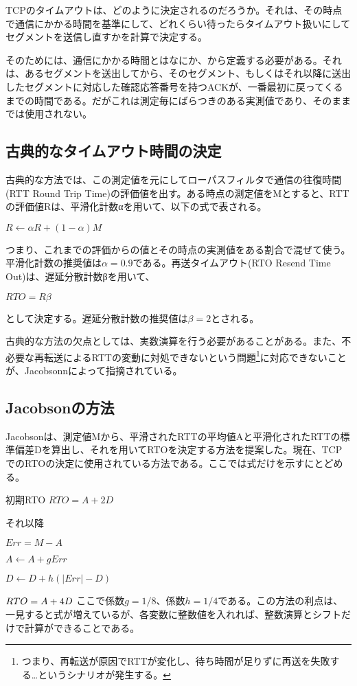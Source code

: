 TCPのタイムアウトは、どのように決定されるのだろうか。それは、その時点で通信にかかる時間を基準にして、どれくらい待ったらタイムアウト扱いにしてセグメントを送信し直すかを計算で決定する。

そのためには、通信にかかる時間とはなにか、から定義する必要がある。それは、あるセグメントを送出してから、そのセグメント、もしくはそれ以降に送出したセグメントに対応した確認応答番号を持つACKが、一番最初に戻ってくるまでの時間である。だがこれは測定毎にばらつきのある実測値であり、そのままでは使用されない。

\subsection{古典的なタイムアウト時間の決定}

古典的な方法では、この測定値を元にしてローパスフィルタで通信の往復時間(RTT Round Trip Time)の評価値を出す。ある時点の測定値をMとすると、RTTの評価値Rは、平滑化計数αを用いて、以下の式で表される。


$R ← αR + (1-α)M$


つまり、これまでの評価からの値とその時点の実測値をある割合で混ぜて使う。平滑化計数の推奨値は$α=0.9$である。再送タイムアウト(RTO Resend Time Out)は、遅延分散計数βを用いて、

$RTO = Rβ$

として決定する。遅延分散計数の推奨値は$β=2$とされる。

古典的な方法の欠点としては、実数演算を行う必要があることがある。また、不必要な再転送によるRTTの変動に対処できないという問題\footnote{つまり、再転送が原因でRTTが変化し、待ち時間が足りずに再送を失敗する…というシナリオが発生する。}に対応できないことが、Jacobsonnによって指摘されている。

\subsection{Jacobsonの方法}

Jacobsonは、測定値Mから、平滑されたRTTの平均値Aと平滑化されたRTTの標準偏差Dを算出し、それを用いてRTOを決定する方法を提案した。現在、TCPでのRTOの決定に使用されている方法である。ここでは式だけを示すにとどめる。


初期RTO $RTO = A + 2D$


それ以降 


$Err = M - A $

$A ← A + gErr$

$D ← D + h(|Err| - D) $

$RTO = A + 4D \\$
ここで係数$g=1/8$、係数$h=1/4$である。この方法の利点は、一見すると式が増えているが、各変数に整数値を入れれば、整数演算とシフトだけで計算ができることである。

